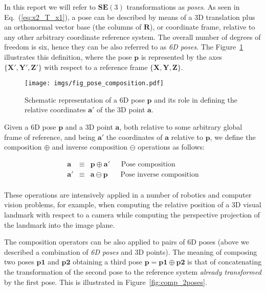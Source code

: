 \documentclass[a4paper,11pt]{report}
\begin{document}
In this report we will refer to $\mathbf{SE}(3)$ transformations as \emph{poses}.
As seen in Eq.~(\ref{eq:x2_T_x1}), a pose can be described by means of a 3D translation
plus an orthonormal vector base (the columns of $\mathbf{R}$),
or coordinate frame, relative to any other arbitrary coordinate reference system.
The overall number of degrees of freedom is six, hence they can be also referred
to as \emph{6D poses}.
The Figure~\ref{fig:1} illustrates this definition, where the pose $\mathbf{p}$ is represented
by the axes $\{\mathbf{X}',\mathbf{Y}',\mathbf{Z}' \}$ with respect to a reference frame
$\{\mathbf{X},\mathbf{Y},\mathbf{Z} \}$.


\begin{figure}[h!]
\centering
\texttt{[image: imgs/fig\_pose\_composition.pdf]}
\caption{Schematic representation of a 6D pose $\mathbf{p}$ and its role in defining
the relative coordinates $\mathbf{a}'$ of the 3D point $\mathbf{a}$.}
\label{fig:1}
\end{figure}


Given a 6D pose $\mathbf{p}$ and a 3D point $\mathbf{a}$, both relative to some arbitrary
global frame of reference, and being $\mathbf{a}'$ the coordinates of $\mathbf{a}$ relative
to $\mathbf{p}$, we define
the composition $\oplus$ and inverse composition $\ominus$ operations as follows:

\begin{eqnarray*}
\mathbf{a} & \equiv & \mathbf{p} \oplus \mathbf{a}'   ~~~~~~~ \textrm{Pose composition} \\
\mathbf{a'} & \equiv & \mathbf{a} \ominus \mathbf{p}  ~~~~~~~~ \textrm{Pose inverse composition} \\
\end{eqnarray*}

These operations are intensively applied in a number of robotics and computer vision
problems, for example, when computing the relative position of a 3D visual landmark
with respect to a camera while computing the perspective projection of the landmark
into the image plane.

The composition operators can be also applied to pairs of 6D poses (above we described a combination
of \emph{6D poses} and {3D points}).
The meaning of composing two poses $\mathbf{p1}$ and $\mathbf{p2}$
obtaining a third pose $\mathbf{p} = \mathbf{p1} \oplus \mathbf{p2}$
is that of concatenating the transformation of the second pose to the reference system
\emph{already transformed} by the first pose.
This is illustrated in Figure~\ref{fig:comp_2poses}.
\end{document}
